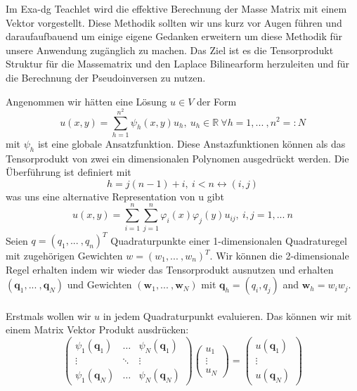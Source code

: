 Im Exa-dg Teachlet wird die effektive Berechnung der Masse Matrix mit einem Vektor vorgestellt. Diese Methodik sollten wir uns kurz vor Augen führen und daraufaufbauend um einige eigene Gedanken erweitern um diese Methodik für unsere Anwendung zugänglich zu machen.
Das Ziel ist es die Tensorprodukt Struktur für die Massematrix und den Laplace Bilinearform herzuleiten und für die Berechnung der Pseudoinversen zu nutzen. 

Angenommen wir hätten eine Lösung $u \in V$ der Form
\begin{equation}
u(x,y)=\sum_{h=1}^{n^2} \psi_h (x,y) u_h,\ u_h \in \mathbb{R} \ \forall h =1,...\ ,n^2=:N
\end{equation}
mit $\psi_h$ ist eine globale Ansatzfunktion. Diese Anstazfunktionen können als das Tensorprodukt von zwei ein dimensionalen Polynomen ausgedrückt werden. Die Überführung ist definiert mit
\begin{equation}
h=j(n-1)+i,\ i<n \leftrightarrow (i,j)
\end{equation}
was uns eine alternative Representation von u gibt
\begin{equation}
u(x,y)=\sum_{i=1}^n \sum_{j=1}^n \varphi_i(x) \varphi_j(y) u_{ij}, \ i,j =1,...\ n
\end{equation}
Seien $q=(q_1,...\ ,q_n)^T$ Quadraturpunkte einer 1-dimensionalen Quadraturegel mit zugehörigen Gewichten $w=(w_1,...\ ,w_n)^T$. Wir können die 2-dimensionale Regel erhalten indem wir wieder das Tensorprodukt ausnutzen und erhalten  $(\bm{q}_1,...\ ,\bm{q}_N)$ und Gewichten $(\bm{w}_1,...\ ,\bm{w}_N)$ mit $\bm{q}_h=(q_i,q_j)$ and $\bm{w}_h=w_i w_j$.\\ \\
Erstmals wollen wir $u$ in jedem Quadraturpunkt evaluieren. Das können wir mit einem Matrix Vektor Produkt ausdrücken:
\begin{equation}
\begin{pmatrix}
\psi_1(\bm{q}_1) & \hdots & \psi_N(\bm{q}_1) \\
\vdots & \ddots & \vdots \\
\psi_1(\bm{q}_N) & \hdots & \psi_N(\bm{q}_N)
\end{pmatrix}
\begin{pmatrix}
u_1 \\
\vdots \\
u_N
\end{pmatrix}
=
\begin{pmatrix}
u(\bm{q}_1) \\
\vdots \\
u(\bm{q}_N)
\end{pmatrix}
\end{equation}
